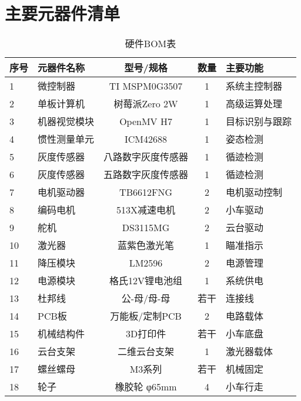 \documentclass[UTF-8,zihao=-4]{ctexart}
\begin{document}
\appendix
\section{主要元器件清单}
\begin{table}[H]
    \centering
    \caption{硬件BOM表}
    \label{tab:bom}
    \begin{tabular}{llccl}
        \toprule
        序号 & 元器件名称 & 型号/规格 & 数量 & 主要功能 \\
        \midrule
        1 & 微控制器 & TI MSPM0G3507 & 1 & 系统主控制器 \\
        2 & 单板计算机 & 树莓派Zero 2W & 1 & 高级运算处理 \\
        3 & 机器视觉模块 & OpenMV H7 & 1 & 目标识别与跟踪 \\
        4 & 惯性测量单元 & ICM42688 & 1 & 姿态检测 \\
        5 & 灰度传感器 & 八路数字灰度传感器 & 1 & 循迹检测 \\
        6 & 灰度传感器 & 五路数字灰度传感器 & 1 & 循迹检测 \\
        7 & 电机驱动器 & TB6612FNG & 2 & 电机驱动控制 \\
        8 & 编码电机 & 513X减速电机 & 2 & 小车驱动 \\
        9 & 舵机 & DS3115MG & 2 & 云台驱动 \\
        10 & 激光器 & 蓝紫色激光笔 & 1 & 瞄准指示 \\
        11 & 降压模块 & LM2596 & 2 & 电源管理 \\
        12 & 电源模块 & 格氏12V锂电池组 & 1 & 系统供电 \\
        13 & 杜邦线 & 公-母/母-母 & 若干 & 连接线 \\
        14 & PCB板 & 万能板/定制PCB & 2 & 电路载体 \\
        15 & 机械结构件 & 3D打印件 & 若干 & 小车底盘 \\
        16 & 云台支架 & 二维云台支架 & 1 & 激光器载体 \\
        17 & 螺丝螺母 & M3系列 & 若干 & 机械固定 \\
        18 & 轮子 & 橡胶轮 φ65mm & 4 & 小车行走 \\
        \bottomrule
    \end{tabular}
\end{table}
\end{document}
